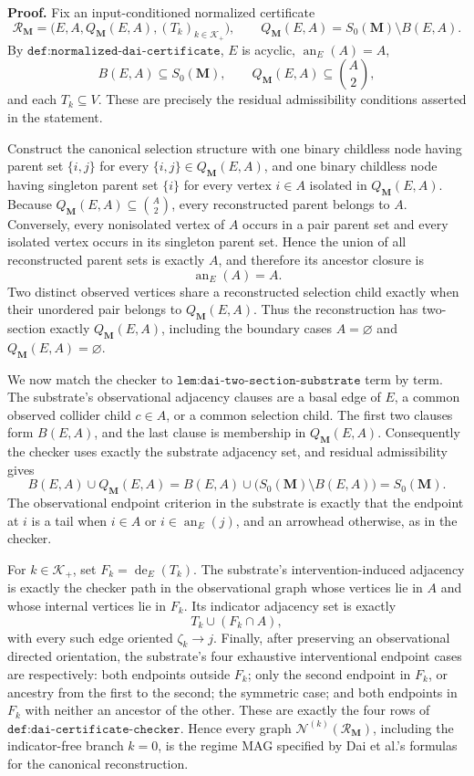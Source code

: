 \textbf{Proof.}
Fix an input-conditioned normalized certificate
\[
\mathcal R_{\mathbf M}
=\bigl(E,A,Q_{\mathbf M}(E,A),(T_k)_{k\in\mathcal K_+}\bigr),
\qquad
Q_{\mathbf M}(E,A)=S_0(\mathbf M)\setminus B(E,A).
\]
By \(\texttt{def:normalized-dai-certificate}\), \(E\) is acyclic, \(\operatorname{an}_E(A)=A\),
\[
B(E,A)\subseteq S_0(\mathbf M),
\qquad
Q_{\mathbf M}(E,A)\subseteq\binom A2,
\]
and each \(T_k\subseteq V\).  These are precisely the residual admissibility conditions asserted in the statement.

Construct the canonical selection structure with one binary childless node having parent set \(\{i,j\}\) for every \(\{i,j\}\in Q_{\mathbf M}(E,A)\), and one binary childless node having singleton parent set \(\{i\}\) for every vertex \(i\in A\) isolated in \(Q_{\mathbf M}(E,A)\).  Because \(Q_{\mathbf M}(E,A)\subseteq\binom A2\), every reconstructed parent belongs to \(A\).  Conversely, every nonisolated vertex of \(A\) occurs in a pair parent set and every isolated vertex occurs in its singleton parent set.  Hence the union of all reconstructed parent sets is exactly \(A\), and therefore its ancestor closure is
\[
\operatorname{an}_E(A)=A.
\]
Two distinct observed vertices share a reconstructed selection child exactly when their unordered pair belongs to \(Q_{\mathbf M}(E,A)\).  Thus the reconstruction has two-section exactly \(Q_{\mathbf M}(E,A)\), including the boundary cases \(A=\varnothing\) and \(Q_{\mathbf M}(E,A)=\varnothing\).

We now match the checker to \(\texttt{lem:dai-two-section-substrate}\) term by term.  The substrate's observational adjacency clauses are a basal edge of \(E\), a common observed collider child \(c\in A\), or a common selection child.  The first two clauses form \(B(E,A)\), and the last clause is membership in \(Q_{\mathbf M}(E,A)\).  Consequently the checker uses exactly the substrate adjacency set, and residual admissibility gives
\[
B(E,A)\cup Q_{\mathbf M}(E,A)
=B(E,A)\cup\bigl(S_0(\mathbf M)\setminus B(E,A)\bigr)
=S_0(\mathbf M).
\]
The observational endpoint criterion in the substrate is exactly that the endpoint at \(i\) is a tail when \(i\in A\) or \(i\in\operatorname{an}_E(j)\), and an arrowhead otherwise, as in the checker.

For \(k\in\mathcal K_+\), set \(F_k=\operatorname{de}_E(T_k)\).  The substrate's intervention-induced adjacency is exactly the checker path in the observational graph whose vertices lie in \(A\) and whose internal vertices lie in \(F_k\).  Its indicator adjacency set is exactly
\[
T_k\cup(F_k\cap A),
\]
with every such edge oriented \(\zeta_k\to j\).  Finally, after preserving an observational directed orientation, the substrate's four exhaustive interventional endpoint cases are respectively: both endpoints outside \(F_k\); only the second endpoint in \(F_k\), or ancestry from the first to the second; the symmetric case; and both endpoints in \(F_k\) with neither an ancestor of the other.  These are exactly the four rows of \(\texttt{def:dai-certificate-checker}\).  Hence every graph \(\mathcal N^{(k)}(\mathcal R_{\mathbf M})\), including the indicator-free branch \(k=0\), is the regime MAG specified by Dai et al.'s formulas for the canonical reconstruction.

